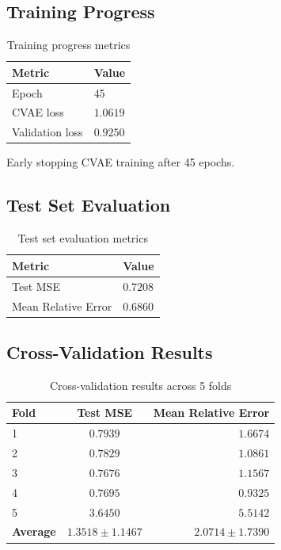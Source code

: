 \documentclass{article}
\begin{document}
\subsection{Training Progress}
\begin{table}[H]
\centering
\begin{tabular}{ll}
\toprule
\textbf{Metric} & \textbf{Value} \\
\midrule
Epoch & 45 \\
CVAE loss & $1.0619$ \\
Validation loss & $0.9250$ \\
\bottomrule
\end{tabular}
\caption{Training progress metrics}
\label{tab:training_progress}
\end{table}

\medskip

Early stopping CVAE training after 45 epochs.

\subsection{Test Set Evaluation}
\begin{table}[H]
\centering
\begin{tabular}{ll}
\toprule
\textbf{Metric} & \textbf{Value} \\
\midrule
Test MSE & $0.7208$ \\
Mean Relative Error & $0.6860$ \\
\bottomrule
\end{tabular}
\caption{Test set evaluation metrics}
\label{tab:test_evaluation}
\end{table}

\medskip

\subsection{Cross-Validation Results}
\begin{table}[H]
\centering
\begin{tabular}{lcr}
\toprule
\textbf{Fold} & \textbf{Test MSE} & \textbf{Mean Relative Error} \\
\midrule
1 & $0.7939$ & $1.6674$ \\
2 & $0.7829$ & $1.0861$ \\
3 & $0.7676$ & $1.1567$ \\
4 & $0.7695$ & $0.9325$ \\
5 & $3.6450$ & $5.5142$ \\
\midrule
\textbf{Average} & $1.3518 \pm 1.1467$ & $2.0714 \pm 1.7390$ \\
\bottomrule
\end{tabular}
\caption{Cross-validation results across 5 folds}
\label{tab:cross_validation}
\end{table}
\end{document}
